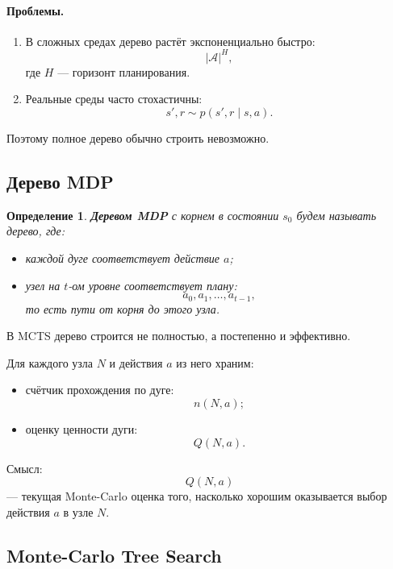 \documentclass[12pt,a4paper]{article}
\newtheorem{definition}{Определение}
\begin{document}
\paragraph{Проблемы.}

\begin{enumerate}
    \item В сложных средах дерево растёт экспоненциально быстро:
    \[
    |\mathcal A|^H,
    \]
    где $H$ --- горизонт планирования.

    \item Реальные среды часто стохастичны:
    \[
    s',r\sim p(s',r\mid s,a).
    \]
\end{enumerate}

Поэтому полное дерево обычно строить невозможно.

\subsection{Дерево MDP}

\begin{definition}
\textbf{Деревом MDP} с корнем в состоянии $s_0$ будем называть дерево, где:
\begin{itemize}
    \item каждой дуге соответствует действие $a$;
    \item узел на $t$-ом уровне соответствует плану:
    \[
    a_0,a_1,\ldots,a_{t-1},
    \]
    то есть пути от корня до этого узла.
\end{itemize}
\end{definition}

В MCTS дерево строится не полностью, а постепенно и эффективно.

Для каждого узла $N$ и действия $a$ из него храним:

\begin{itemize}
    \item счётчик прохождения по дуге:
    \[
    n(N,a);
    \]

    \item оценку ценности дуги:
    \[
    Q(N,a).
    \]
\end{itemize}

Смысл:
\[
Q(N,a)
\]
--- текущая Monte-Carlo оценка того, насколько хорошим оказывается выбор действия $a$ в узле $N$.

\subsection{Monte-Carlo Tree Search}
\end{document}
